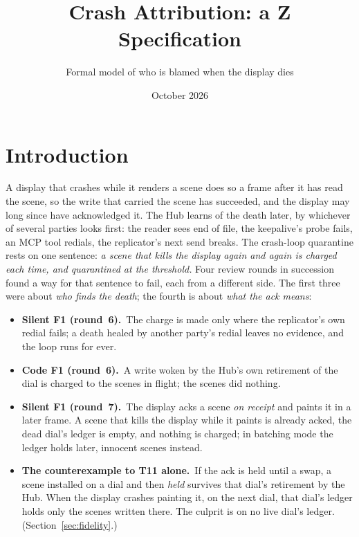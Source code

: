 \documentclass[a4paper,10pt,fleqn]{article}
\begin{document}
\title{Crash Attribution: a Z Specification}
\author{Formal model of who is blamed when the display dies}
\date{October 2026}
\maketitle

\section{Introduction}

A display that crashes while it renders a scene does so a frame after it has
read the scene, so the write that carried the scene has succeeded, and the
display may long since have acknowledged it.  The Hub learns of the death later,
by whichever of several parties looks first: the reader sees end of file, the
keepalive's probe fails, an MCP tool redials, the replicator's next send
breaks.  The crash-loop quarantine rests on one sentence: \emph{a scene that
kills the display again and again is charged each time, and quarantined at the
threshold.}  Four review rounds in succession found a way for that sentence to
fail, each from a different side.  The first three were about \emph{who finds
the death}; the fourth is about \emph{what the ack means}:

\begin{itemize}
  \item \textbf{Silent F1 (round~6).}\ The charge is made only where the
    replicator's own redial fails; a death healed by another party's redial
    leaves no evidence, and the loop runs for ever.
  \item \textbf{Code F1 (round~6).}\ A write woken by the Hub's own retirement of
    the dial is charged to the scenes in flight; the scenes did nothing.
  \item \textbf{Silent F1 (round~7).}\ The display acks a scene \emph{on receipt}
    and paints it in a later frame.  A scene that kills the display while it
    paints is already acked, the dead dial's ledger is empty, and nothing is
    charged; in batching mode the ledger holds later, innocent scenes instead.
  \item \textbf{The counterexample to T11 alone.}\ If the ack is held until a
    swap, a scene installed on a dial and then \emph{held} survives that dial's
    retirement by the Hub.  When the display crashes painting it, on the next
    dial, that dial's ledger holds only the scenes written there.  The culprit
    is on no live dial's ledger.  (Section~\ref{sec:fidelity}.)
\end{itemize}
\end{document}
